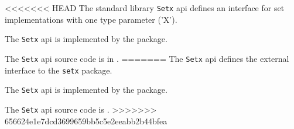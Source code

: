 
<<<<<<< HEAD
The standard library {\tt Setx} api defines an interface for set implementations with one type parameter ('X').

The {\tt Setx} api is implemented by the 
 package.

The {\tt Setx} api source code is in .
=======
The {\tt Setx} api defines the external interface to the {\tt setx} package.

The {\tt Setx} api is implemented by the  package.

The {\tt Setx} api source code is .
>>>>>>> 656624e1e7dcd3699659bb5c5e2eeabb2b44bfea
